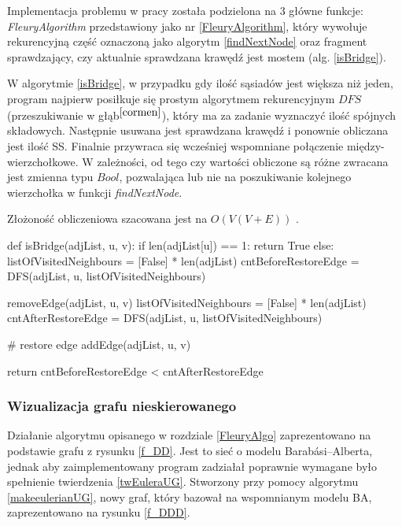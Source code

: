 \documentclass[a4paper, 12pt, twoside, openright]{article}
\begin{document}
	Implementacja problemu w pracy została podzielona na 3 główne funkcje: \textit{FleuryAlgorithm} przedstawiony jako nr \ref{FleuryAlgorithm}, który wywołuje rekurencyjną część oznaczoną jako algorytm \ref{findNextNode} oraz fragment sprawdzający, czy aktualnie sprawdzana krawędź jest mostem (alg. \ref{isBridge}).
 
	W algorytmie \ref{isBridge}, w przypadku gdy ilość sąsiadów jest większa niż jeden, program najpierw posiłkuje się prostym algorytmem rekurencyjnym $DFS$ (przeszukiwanie w głąb$^{\cite{cormen}}$), który ma za zadanie wyznaczyć ilość spójnych składowych. Następnie usuwana jest sprawdzana krawędź i ponownie obliczana jest ilość SS. Finalnie przywraca się wcześniej wspomniane połączenie między-wierzchołkowe. W zależności, od tego czy wartości obliczone są różne zwracana jest zmienna typu $Bool$, pozwalająca lub nie na poszukiwanie kolejnego wierzchołka w funkcji \textit{findNextNode}.
	
	Złożoność obliczeniowa szacowana jest na $O(V(V+E))$ \label{zl_Fle}.

\begin{algorithm}[caption={\textit{isBridge} rekurencyjna funkcja pomocnicza dla \textit{FleuryAlgorithm} }, label={isBridge}]
def isBridge(adjList, u, v):
	if len(adjList[u]) == 1:
		return True
	else:
		listOfVisitedNeighbours = [False] * len(adjList)
		cntBeforeRestoreEdge = DFS(adjList, u, listOfVisitedNeighbours)
		
		removeEdge(adjList, u, v)
		listOfVisitedNeighbours = [False] * len(adjList)
		cntAfterRestoreEdge = DFS(adjList, u, listOfVisitedNeighbours)
		
		# restore edge
		addEdge(adjList, u, v)
		
		return cntBeforeRestoreEdge < cntAfterRestoreEdge

\end{algorithm}

\subsubsection{Wizualizacja grafu nieskierowanego}
\indent\par
Działanie algorytmu opisanego w rozdziale \ref{FleuryAlgo} zaprezentowano na podstawie grafu z rysunku \ref{f_DD}. Jest to sieć o modelu Barabási–Alberta, jednak aby zaimplementowany program zadziałał poprawnie wymagane było spełnienie twierdzenia \ref{twEuleraUG}. Stworzony przy pomocy algorytmu \ref{makeeulerianUG}, nowy graf, który bazował na wspomnianym modelu BA, zaprezentowano na rysunku \ref{f_DDD}. 
\end{document}
